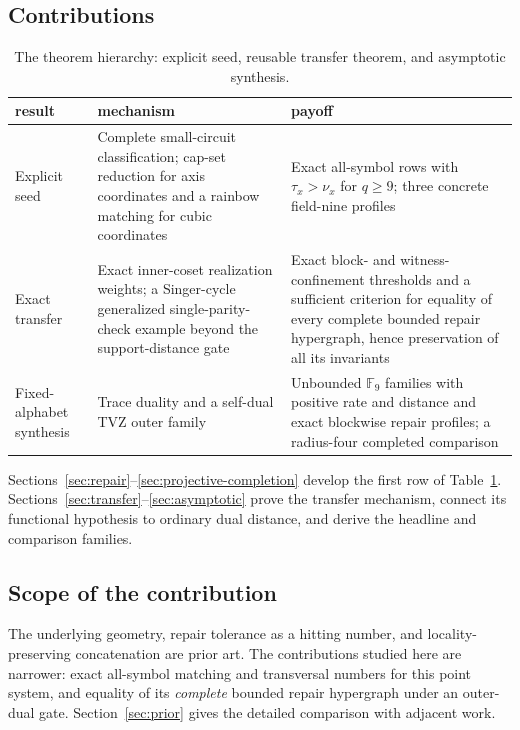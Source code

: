 \documentclass[11pt]{article}
\theoremstyle{definition}
\theoremstyle{remark}
\newcommand{\F}{\mathbb{F}}
\begin{document}
\subsection*{Contributions}

\begin{table}[ht]
\centering
\small
\begin{tabularx}{\textwidth}{@{}>{\raggedright\arraybackslash}p{}
  >{\raggedright\arraybackslash}X
  >{\raggedright\arraybackslash}p{}@{}}
\toprule
result & mechanism & payoff \\
\midrule
Explicit seed
& Complete small-circuit classification; cap-set reduction for axis
  coordinates and a rainbow matching for cubic coordinates
& Exact all-symbol rows with $\tau_x>\nu_x$ for $q\geq9$; three concrete
  field-nine profiles \\
Exact transfer
& Exact inner-coset realization weights; a Singer-cycle generalized
  single-parity-check example beyond the support-distance gate
& Exact block- and witness-confinement thresholds and a sufficient criterion
  for equality of every complete bounded repair hypergraph, hence
  preservation of all its invariants \\
Fixed-alphabet synthesis
& Trace duality and a self-dual TVZ outer family
& Unbounded $\F_9$ families with positive rate and distance and exact
  blockwise repair profiles; a radius-four completed comparison \\
\bottomrule
\end{tabularx}
\caption{The theorem hierarchy: explicit seed, reusable transfer theorem,
and asymptotic synthesis.}
\label{tab:contributions}
\end{table}

Sections~\ref{sec:repair}--\ref{sec:projective-completion} develop the first
row of Table~\ref{tab:contributions}.  Sections~\ref{sec:transfer}--\ref{sec:asymptotic}
prove the transfer mechanism, connect its functional hypothesis to ordinary
dual distance, and derive the headline and comparison families.

\subsection*{Scope of the contribution}

The underlying geometry, repair tolerance as a hitting number, and
locality-preserving concatenation are prior art.  The contributions studied
here are narrower: exact all-symbol matching and transversal numbers for this
point system, and equality of its \emph{complete} bounded repair hypergraph
under an outer-dual gate.  Section~\ref{sec:prior} gives the detailed
comparison with adjacent work.
\end{document}

